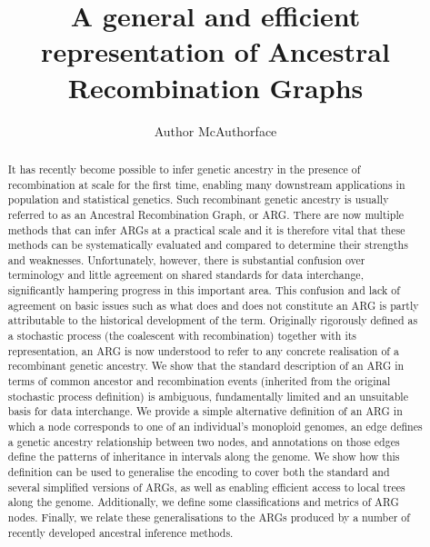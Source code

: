 \documentclass{article}
\begin{document}
\linenumbers
\title{A general and efficient representation of Ancestral Recombination Graphs}
\author{Author McAuthorface}

\maketitle

\begin{abstract}
It has recently become possible to infer genetic ancestry in the presence of
recombination at scale for the first time, enabling many
downstream applications in population and statistical genetics.
Such recombinant genetic ancestry is usually
referred to as an Ancestral Recombination Graph, or ARG.
There are now multiple methods that can infer ARGs at a practical scale
and it is therefore vital that these methods can be systematically evaluated
and compared to determine their strengths and weaknesses.
Unfortunately, however, there is substantial confusion over
terminology and little agreement on shared standards for data interchange,
significantly hampering progress in this important area.
This confusion and lack of agreement on basic issues such as what does and
does not constitute an ARG is partly attributable to the historical
development of the term.
Originally rigorously defined as
a stochastic process (the coalescent with recombination) together with its
representation, an ARG is now understood to refer to any
concrete realisation of a recombinant genetic ancestry.
We show that the standard description of an ARG
in terms of common ancestor and recombination events
(inherited from the original stochastic process definition) is
ambiguous, fundamentally limited and an unsuitable basis for data interchange.
We provide a simple alternative definition of an ARG in which a node
corresponds to one of an individual's monoploid genomes, an edge
defines a genetic ancestry relationship between two nodes,
and annotations on those edges define the patterns of
inheritance in intervals along the genome.
We show how this definition can be used to generalise the encoding to
cover both the standard and several simplified versions of ARGs, as well as
enabling efficient access to local trees along the genome. Additionally, we
define some classifications and metrics of ARG nodes. Finally, we relate
these generalisations to the ARGs produced by a number of recently
developed ancestral inference methods.
\end{abstract}
\end{document}
